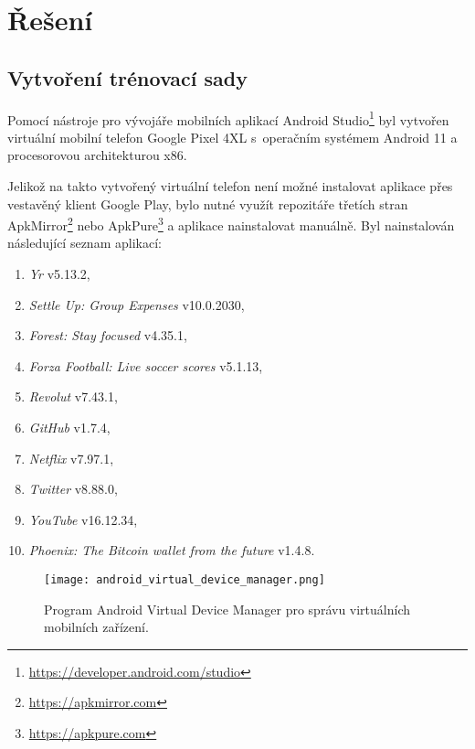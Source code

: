 
\section{Řešení}
\label{sec_solution}

\subsection{Vytvoření trénovací sady}

Pomocí nástroje pro vývojáře mobilních aplikací Android Studio\footnote{\url{https://developer.android.com/studio}} byl vytvořen virtuální mobilní telefon Google Pixel 4XL s~operačním systémem Android 11 a procesorovou architekturou x86.

Jelikož na takto vytvořený virtuální telefon není možné instalovat aplikace přes vestavěný klient Google Play, bylo nutné využít repozitáře třetích stran ApkMirror\footnote{\url{https://apkmirror.com}} nebo ApkPure\footnote{\url{https://apkpure.com}} a aplikace nainstalovat manuálně. Byl nainstalován následující seznam aplikací:

\begin{enumerate}
    \item \textit{Yr} v5.13.2,
    \item \textit{Settle Up: Group Expenses} v10.0.2030,
    \item \textit{Forest: Stay focused} v4.35.1,
    \item \textit{Forza Football: Live soccer scores} v5.1.13,
    \item \textit{Revolut} v7.43.1,
    \item \textit{GitHub} v1.7.4,
    \item \textit{Netflix} v7.97.1,
    \item \textit{Twitter} v8.88.0,
    \item \textit{YouTube} v16.12.34,
    \item \textit{Phoenix: The Bitcoin wallet from the future} v1.4.8.
\end{enumerate}

\begin{figure}[H]
    \centering
    \texttt{[image: android\_virtual\_device\_manager.png]}
    \caption{Program Android Virtual Device Manager pro správu virtuálních mobilních zařízení.}
    \label{fig_android_virtual_device_manager}
\end{figure}

